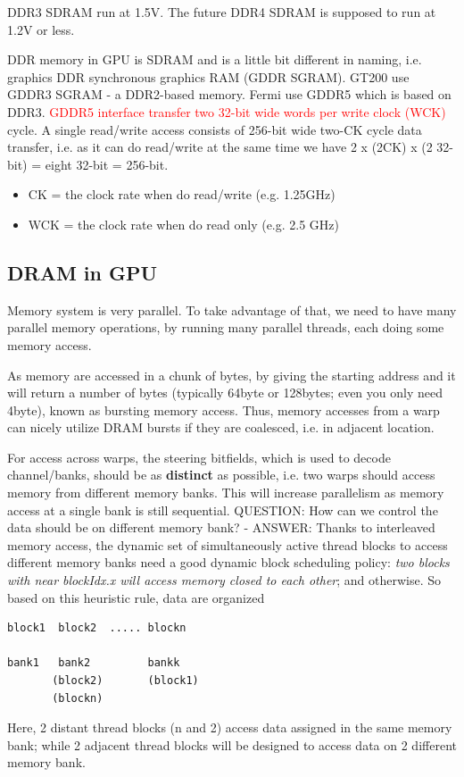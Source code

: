\begin{framed}
  DDR3 SDRAM run at 1.5V. The future DDR4 SDRAM is supposed to run at
  1.2V or less. 
\end{framed}

DDR memory in GPU is SDRAM and is a little bit different in naming,
i.e. graphics DDR synchronous graphics RAM (GDDR SGRAM). GT200 use
GDDR3 SGRAM - a DDR2-based memory. Fermi use GDDR5 which is based on
DDR3.
\textcolor{red}{GDDR5 interface transfer two 32-bit wide words per
  write clock (WCK)}
cycle. A single read/write access consists of 256-bit wide two-CK
cycle data transfer, i.e. as it can do read/write at the same time we
have 2 x (2CK) x (2 32-bit) = eight 32-bit = 256-bit.
\begin{itemize}
\item CK = the clock rate when do read/write (e.g. 1.25GHz)
\item WCK = the clock rate when do read only (e.g. 2.5 GHz)
\end{itemize}


\subsection{DRAM in GPU}
\label{sec:dram-gpu}

Memory system is very parallel. To take advantage of that, we need to
have many parallel memory operations, by running many parallel
threads, each doing some memory access.

As memory are accessed in a chunk of bytes, by giving the starting
address and it will return a number of bytes (typically 64byte or
128bytes; even you only need 4byte), known as bursting memory
access. Thus, memory accesses from a warp can nicely utilize DRAM
bursts if they are coalesced, i.e. in adjacent location.

For access across warps, the steering bitfields, which is used to
decode channel/banks, should be as {\bf distinct} as possible,
i.e. two warps should access memory from different memory banks. This
will increase parallelism as memory access at a single bank is still
sequential. QUESTION: How can we control the data should be on
different memory bank? - ANSWER: Thanks to interleaved memory access,
the dynamic set of simultaneously active thread blocks to access
different memory banks need a good dynamic block scheduling policy:
{\it two blocks with near blockIdx.x will access memory closed to each
  other};
and otherwise. So based on this heuristic rule, data are organized
\begin{verbatim}
block1  block2  ..... blockn

bank1   bank2         bankk
       (block2)       (block1)
       (blockn)
\end{verbatim}
Here, 2 distant thread blocks (n and 2) access data assigned in the
same memory bank; while 2 adjacent thread blocks will be designed to
access data on 2 different memory bank.


